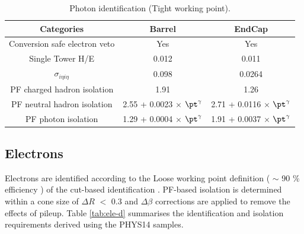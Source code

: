\begin{table}[ht!]
  \caption{Photon identification (Tight working point).\label{tab:photon-id-gamma}}
  \centering
  \footnotesize
  \begin{tabular}{ ccc }
    \hline
    \hline
    Categories                    & Barrel                             & EndCap                             \\
    \hline
    Conversion safe electron veto & Yes                                & Yes                                \\
    Single Tower H/E              & 0.012                              & 0.011                               \\
    $\sigma_{i\eta i\eta}$        & 0.098                              & 0.0264                               \\
    PF charged hadron isolation   & 1.91                               & 1.26                               \\
    PF neutral hadron isolation   & 2.55 + 0.0023 $\times$ $\pt^{\gamma}$  & 2.71 + 0.0116 $\times$ $\pt^{\gamma}$  \\
    PF photon isolation           & 1.29 + 0.0004 $\times$ $\pt^{\gamma}$ & 1.91 + 0.0037 $\times$ $\pt^{\gamma}$ \\
    \hline
    \hline
  \end{tabular}
  \end{table}


\subsection{Electrons}
\label{sec:electron-id}
Electrons are identified according to the Loose working point definition ( $\sim$ 90 $\%$ efficiency ) of the cut-based identification \cite{electron-id}. PF-based isolation \cite{pf-photon} is determined within a cone size of $\Delta R$ $<$ 0.3 and $\Delta \beta$ corrections are applied to remove the effects of pileup. Table \ref{tab:ele-d} summarises the identification and isolation requirements derived using the PHYS14 samples. 	

